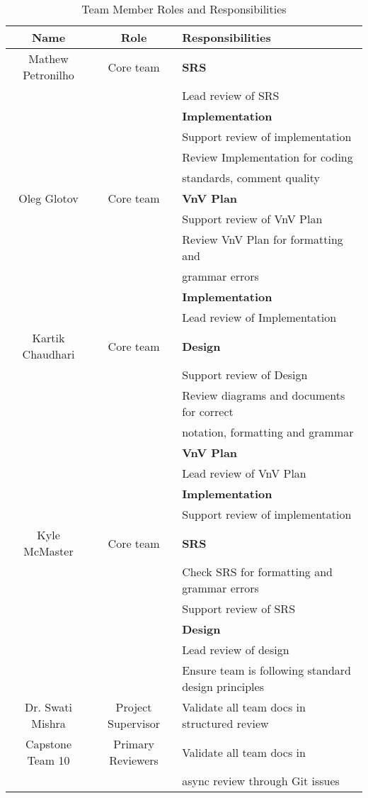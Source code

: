 \documentclass[12pt, titlepage]{article}
\begin{document}
\begin{table}[H]
    \centering
    \begin{tabular}{|c|c|l|}
      \hline
      \textbf{Name} & \textbf{Role} & \textbf{Responsibilities}\\\hline
      Mathew Petronilho & Core team & \textbf{SRS} \\
      & & Lead review of SRS\\
      & & \textbf{Implementation}\\
      & & Support review of implementation\\
      & & Review Implementation for coding \\
      & & standards, comment quality\\
      \hline
      Oleg Glotov & Core team & \textbf{VnV Plan} \\
      & & Support review of VnV Plan\\
      & & Review VnV Plan for formatting and \\
      & & grammar errors\\
      & & \textbf{Implementation}\\
      & & Lead review of Implementation\\
      \hline
      Kartik Chaudhari & Core team & \textbf{Design} \\
      & & Support review of Design\\
      & & Review diagrams and documents for correct \\
      & & notation, formatting and grammar\\
      & & \textbf{VnV Plan}\\
      & & Lead review of VnV Plan\\
      & & \textbf{Implementation}\\
      & & Support review of implementation\\
      \hline
      Kyle McMaster & Core team & \textbf{SRS} \\
      & & Check SRS for formatting and grammar errors\\
      & & Support review of SRS\\
      & & \textbf{Design}\\
      & & Lead review of design\\
      & & Ensure team is following standard design principles\\
      \hline
      Dr. Swati Mishra & Project Supervisor & Validate all team docs in structured review\\\hline
      Capstone Team 10 & Primary Reviewers & Validate all team docs in \\
      & & async review through Git issues\\
      \hline
    \end{tabular}
    \caption{Team Member Roles and Responsibilities}
\end{table}
\end{document}
